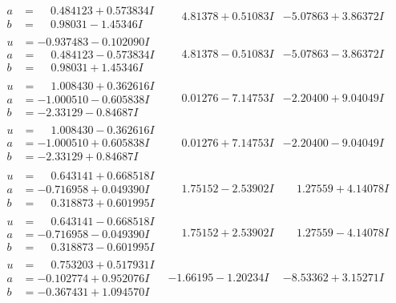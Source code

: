 \documentclass[1p]{elsarticle_modified}
\theoremstyle{definition}
\begin{document}
$$\begin{array}{c|c|c}
\begin{aligned}
a &= \phantom{-}0.484123 + 0.573834 I \\
b &= \phantom{-}0.98031 - 1.45346 I\end{aligned}
 & \phantom{-}4.81378 + 0.51083 I & -5.07863 + 3.86372 I \\ \hline\begin{aligned}
u &= -0.937483 - 0.102090 I \\
a &= \phantom{-}0.484123 - 0.573834 I \\
b &= \phantom{-}0.98031 + 1.45346 I\end{aligned}
 & \phantom{-}4.81378 - 0.51083 I & -5.07863 - 3.86372 I \\ \hline\begin{aligned}
u &= \phantom{-}1.008430 + 0.362616 I \\
a &= -1.000510 - 0.605838 I \\
b &= -2.33129 - 0.84687 I\end{aligned}
 & \phantom{-}0.01276 - 7.14753 I & -2.20400 + 9.04049 I \\ \hline\begin{aligned}
u &= \phantom{-}1.008430 - 0.362616 I \\
a &= -1.000510 + 0.605838 I \\
b &= -2.33129 + 0.84687 I\end{aligned}
 & \phantom{-}0.01276 + 7.14753 I & -2.20400 - 9.04049 I \\ \hline\begin{aligned}
u &= \phantom{-}0.643141 + 0.668518 I \\
a &= -0.716958 + 0.049390 I \\
b &= \phantom{-}0.318873 + 0.601995 I\end{aligned}
 & \phantom{-}1.75152 - 2.53902 I & \phantom{-}1.27559 + 4.14078 I \\ \hline\begin{aligned}
u &= \phantom{-}0.643141 - 0.668518 I \\
a &= -0.716958 - 0.049390 I \\
b &= \phantom{-}0.318873 - 0.601995 I\end{aligned}
 & \phantom{-}1.75152 + 2.53902 I & \phantom{-}1.27559 - 4.14078 I \\ \hline\begin{aligned}
u &= \phantom{-}0.753203 + 0.517931 I \\
a &= -0.102774 + 0.952076 I \\
b &= -0.367431 + 1.094570 I\end{aligned}
 & -1.66195 - 1.20234 I & -8.53362 + 3.15271 I \\ \hline\begin{aligned}

\end{aligned}
\end{array}$$
\end{document}

